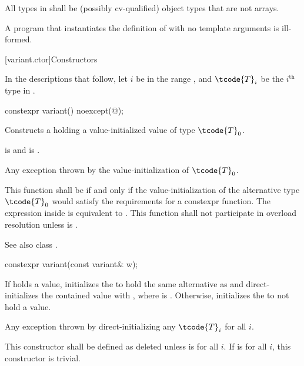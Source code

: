 \pnum
All types in  shall be (possibly cv-qualified)
object types that are not arrays.

\pnum
A program that instantiates the definition of  with
no template arguments is ill-formed.

[variant.ctor]{Constructors}

\pnum
In the descriptions that follow, let $i$ be in the range ,
and $\tcode{T}_i$ be the $i^\text{th}$ type in .

%
\begin{itemdecl}
constexpr variant() noexcept(@\seebelow@);
\end{itemdecl}

\begin{itemdescr}
\pnum
\effects
Constructs a  holding a value-initialized value of type $\tcode{T}_0$.

\pnum
\ensures
{} is  and  is .

\pnum
\throws
Any exception thrown by the value-initialization of $\tcode{T}_0$.

\pnum
\remarks
This function shall be  if and only if the
value-initialization of the alternative type $\tcode{T}_0$ would satisfy the
requirements for a constexpr function.
The expression inside  is equivalent to
.
This function shall not participate in overload resolution unless
 is .
\begin{note} See also class . \end{note}
\end{itemdescr}

%
\begin{itemdecl}
constexpr variant(const variant& w);
\end{itemdecl}

\begin{itemdescr}
\pnum
\effects
If  holds a value, initializes the  to hold the same
alternative as  and direct-initializes the contained value
with , where  is .
Otherwise, initializes the  to not hold a value.

\pnum
\throws
Any exception thrown by direct-initializing any $\tcode{T}_i$ for all $i$.

\pnum
\remarks
This constructor shall be defined as deleted unless
 is  for all $i$.
If 
is  for all $i$, this constructor is trivial.
\end{itemdescr}

